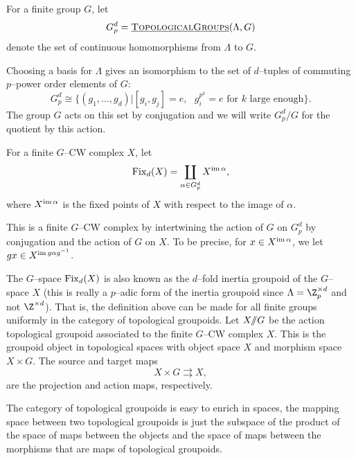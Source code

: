 
\begin{definition}
For a finite group $G$, let
\[
G_{p}^{d} = \operatorname{\underline{\smash{\normalfont\textsc{TopologicalGroups}}}}(\Lambda,G)
\]
denote the set of continuous homomorphisms from $\Lambda$ to $G$.
\end{definition}

Choosing a basis for $\Lambda$ gives an isomorphism to the set of $d$--tuples of commuting $p$--power order elements of $G$:
\[
G_{p}^{d} \cong \{(g_1,\ldots, g_d)|[g_i,g_j] = e, \text{ } g_{i}^{p^k}=e \text{ for } k \text{ large enough}\}.
\]
The group $G$ acts on this set by conjugation and we will write $G_{p}^{d}/G$ for the quotient by this action.

\begin{definition} \label{fix}
For a finite $G$--CW complex $X$, let
\[
\operatorname{Fix}_d(X) = \coprod_{\alpha \in G_{p}^{d}} X^{\operatorname{im} \alpha},
\]
where $X^{\operatorname{im} \alpha}$ is the fixed points of $X$ with respect to the image of $\alpha$.
\end{definition}

This is a finite $G$--CW complex by intertwining the action of $G$ on $G_{p}^{d}$ by conjugation and the action of $G$ on $X$. To be precise, for $x \in X^{\operatorname{im} \alpha}$, we let $gx \in X^{\operatorname{im} g \alpha g^{-1}}$.

The $G$--space $\operatorname{Fix}_d(X)$ is also known as the $d$--fold inertia groupoid of the $G$--space $X$ (this is really a $p$--adic form of the inertia groupoid since $\Lambda = \Z_{p}^{\times d}$ and not $\Z^{\times d}$). That is, the definition above can be made for all finite groups uniformly in the category of topological groupoids. Let $X /\!\!/ G$ be the action topological groupoid associated to the finite $G$--CW complex $X$. This is the groupoid object in topological spaces with object space $X$ and morphism space $X \times G$. The source and target maps
\[
X \times G \rightrightarrows X,
\]
are the projection and action maps, respectively.


The category of topological groupoids is easy to enrich in spaces, the mapping space between two topological groupoids is just the subspace of the product of the space of maps between the objects and the space of maps between the morphisms that are maps of topological groupoids. 

